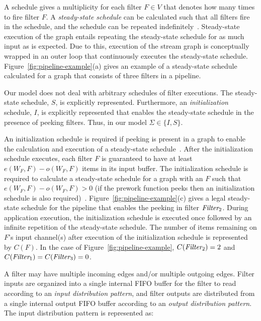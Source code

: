 A schedule gives a multiplicity for each filter $F \in V$ that denotes
how many times to fire filter $F$. A {\it steady-state schedule} can
be calculated such that all filters fire in the schedule, and the
schedule can be repeated indefinitely~\cite{lee87}.  Steady-state
execution of the graph entails repeating the steady-state schedule for
as much input as is expected.  Due to this, execution of the stream
graph is conceptually wrapped in an outer loop that continuously
executes the steady-state schedule.
Figure~\ref{fig:pipeline-example}(a) gives an example of a
steady-state schedule calculated for a graph that consists of three
filters in a pipeline.


Our model does not deal with arbitrary schedules of filter executions.
The steady-state schedule, $S$, is explicitly represented.
Furthermore, an {\it initialization} schedule, $I$, is explicitly
represented that enables the steady-state schedule in the presence of
peeking filters.  Thus, in our model $\Sigma \in \{I, S\}$. 

An initialization schedule is required if peeking is present in a
graph to enable the calculation and execution of a steady-state
schedule~\cite{karczma-thesis}.  After the initialization schedule
executes, each filter $F$ is guaranteed to have at least $e(W_F, F) -
o(W_F, F)$ items in its input buffer. The initialization schedule is
required to calculate a steady-state schedule for a graph with an $F$
such that $e(W_F, F) - o(W_F, F) > 0$ (if the prework function peeks
then an initialization schedule is also
required)~\cite{karczmarek-lctes03}.
Figure~\ref{fig:pipeline-example}(c) gives a legal steady-state
schedule for the pipeline that enables the peeking in filter
$\mbox{\it Filter}_2$.  During application execution, the initialization
schedule is executed once followed by an infinite repetition of the
steady-state schedule.   The number
of items remaining on $F$'s input channel(s) after execution of the
initialization schedule is represented by $C(F)$.  In the case of
Figure~\ref{fig:pipeline-example}, $C(\mbox{\it Filter}_2) = 2$ and
$C(\mbox{\it Filter}_1) = C(\mbox{\it Filter}_3) = 0$.

A filter may have multiple incoming edges and/or multiple outgoing
edges.  Filter inputs are organized into a single internal FIFO buffer for the
filter to read according to an {\it input distribution pattern}, and
filter outputs are distributed from a single internal output FIFO
buffer according to an {\it output distribution pattern}.   
The input distribution pattern is represented as:

